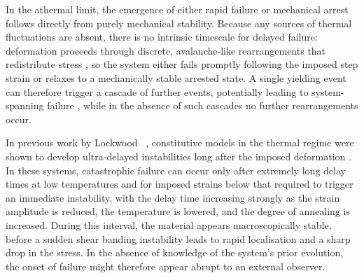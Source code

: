 In the athermal limit, the emergence of either rapid failure or mechanical arrest follows directly from purely mechanical stability. Because any sources of thermal fluctuations are absent, there is no intrinsic timescale for delayed failure: deformation proceeds through discrete, avalanche-like rearrangements that redistribute stress \cite{nicolas_deformation_2018,agoritsas_relevance_2015,ness_oscillatory_2017,lin_hydrodynamic_2015}, so the system either fails promptly following the imposed step strain or relaxes to a mechanically stable arrested state. A single yielding event can therefore trigger a cascade of further events, potentially leading to system-spanning failure \cite{barlow_ductile_2020}, while in the absence of such cascades no further rearrangements occur.


In previous work by Lockwood \etal~\cite{lockwood_ultradelayed_2025}, constitutive models in the thermal regime were shown to develop ultra-delayed instabilities long after the imposed deformation \cite{lockwood_ultradelayed_2025}. In these systems, catastrophic failure can occur only after extremely long delay times at low temperatures and for imposed strains below that required to trigger an immediate instability, with the delay time increasing strongly as the strain amplitude is reduced, the temperature is lowered, and the degree of annealing is increased. During this interval, the material appears macroscopically stable, before a sudden shear banding instability leads to rapid localisation and a sharp drop in the stress. In the absence of knowledge of the system’s prior evolution, the onset of failure might therefore appear abrupt to an external observer.

